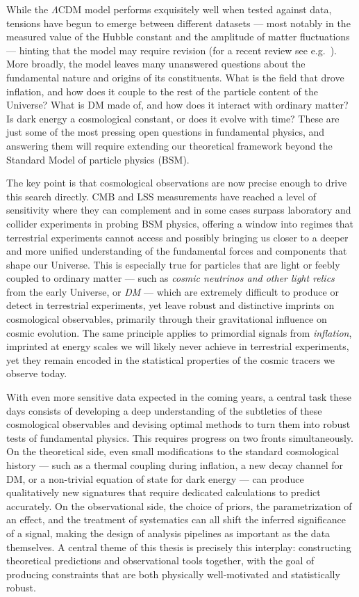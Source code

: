 While the $\Lambda$CDM model performs exquisitely well when tested against data, tensions have begun to emerge between different datasets --- most notably in the measured value of the Hubble constant and the amplitude of matter fluctuations --- hinting that the model may require revision (for a recent review see e.g.~\cite{CosmoVerseNetwork:2025alb}). More broadly, the model leaves many unanswered questions about the fundamental nature and origins of its constituents. What is the field that drove inflation, and how does it couple to the rest of the particle content of the Universe? What is DM made of, and how does it interact with ordinary matter? Is dark energy a cosmological constant, or does it evolve with time? These are just some of the most pressing open questions in fundamental physics, and answering them will require extending our theoretical framework beyond the Standard Model of particle physics (BSM).

The key point is that cosmological observations are now precise enough to drive this search directly. CMB and LSS measurements have reached a level of sensitivity where they can complement and in some cases surpass laboratory and collider experiments in probing BSM physics, offering a window into regimes that terrestrial experiments cannot access and possibly bringing us closer to a deeper and more unified understanding of the fundamental forces and components that shape our Universe. This is especially true for particles that are light or feebly coupled to ordinary matter --- such as \textit{cosmic neutrinos and other light relics} from the early Universe, or \textit{DM} --- which are extremely difficult to produce or detect in terrestrial experiments, yet leave robust and distinctive imprints on cosmological observables, primarily through their gravitational influence on cosmic evolution. The same principle applies to primordial signals from {\it inflation}, imprinted at energy scales we will likely never achieve in terrestrial experiments, yet they remain encoded in the statistical properties of the cosmic tracers we observe today.

With even more sensitive data expected in the coming years, a central task these days consists of developing a deep understanding of the subtleties of these cosmological observables and devising optimal methods to turn them into robust tests of fundamental physics. This requires progress on two fronts simultaneously. On the theoretical side, even small modifications to the standard cosmological history --- such as a thermal coupling during inflation, a new decay channel for DM, or a non-trivial equation of state for dark energy --- can produce qualitatively new signatures that require dedicated calculations to predict accurately. On the observational side, the choice of priors, the parametrization of an effect, and the treatment of systematics can all shift the inferred significance of a signal, making the design of analysis pipelines as important as the data themselves. A central theme of this thesis is precisely this interplay: constructing theoretical predictions and observational tools together, with the goal of producing constraints that are both physically well-motivated and statistically robust.

